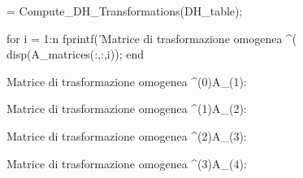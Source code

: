 \documentclass[11pt, a4paper]{article}
\begin{document}
\begin{matlabcode}
 = Compute_DH_Transformations(DH_table);

for i = 1:n
    fprintf('Matrice di trasformazione omogenea ^(%
    disp(A_matrices(:,:,i));
end
\end{matlabcode}
\begin{matlaboutput}
Matrice di trasformazione omogenea ^(0)A_(1):
\end{matlaboutput}
\begin{matlaboutput}
Matrice di trasformazione omogenea ^(1)A_(2):
\end{matlaboutput}
\begin{matlaboutput}
Matrice di trasformazione omogenea ^(2)A_(3):
\end{matlaboutput}
\begin{matlaboutput}
Matrice di trasformazione omogenea ^(3)A_(4):
\end{matlaboutput}
\end{document}
